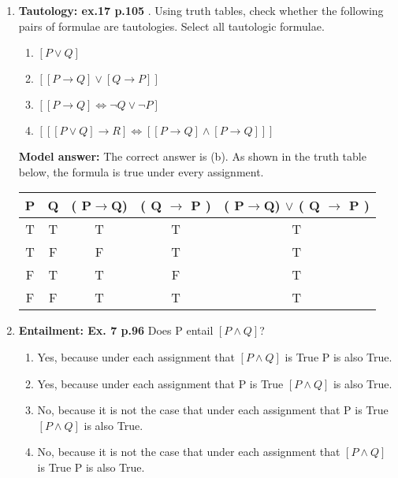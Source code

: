 \documentclass[a4,11pt]{article}
\newcommand{\6}{\mbox{$[\hspace*{-.6mm}[$}}
\newcommand{\9}{\mbox{$]\hspace*{-.6mm}]$}}
\begin{document}
\begin{enumerate}[leftmargin = 12pt]
\begin{enumerate}
\item T T T F equivalent
\item T T T F not equivalent
\item T F T F equivalent
\item T F T F not equivalent
\item T F T F equivalent
\item F F T F not equivalent
\end{enumerate}


{ \bf Model answer:} The correct answer is {\it T T T F equivalent}. The formulae are equivalent because they have the same truth values under every assignment.

\item {\bf Tautology: ex.17 p.105} . Using truth tables, check whether the following pairs of formulae are tautologies. Select all tautologic formulae.

\begin{enumerate}
\item $[P \lor Q]$
\item $[[P\rightarrow Q]  \lor  [Q \rightarrow P]]$
\item $[[P \rightarrow Q] \iff \neg Q \lor \neg P ]$ 
\item $[[[P \lor Q] \rightarrow  R] \iff [[P \rightarrow Q] \land [P \rightarrow  Q]]]$
\end{enumerate}


{ \bf Model answer:} The correct answer is (b). As shown in the truth table below, the formula is true under every assignment.

\begin{tabular}{c | c | c | c | c}
\hline \hline
P & Q &  ( P$\rightarrow$Q) & ( Q $\rightarrow$ P )  & ( P$\rightarrow$Q) $\lor$ ( Q $\rightarrow$ P ) \\
\hline
T & T & T& T & T\\
T & F & F& T & T\\
F & T & T & F& T\\
F & F & T& T& T \\
\hline \hline
\end{tabular}

\item {\bf Entailment: Ex. 7 p.96} Does P entail $[P \land Q]$?

\begin{enumerate}[noitemsep]
\item Yes, because under each assignment that $[P \land Q]$ is True P is also True.
\item Yes, because under each assignment that P is True $[P \land Q]$ is also True.
\item No, because it is not the case that under each assignment that P is True $[P \land Q]$ is also True.
\item No, because it is not the case that under each assignment that $[P \land Q]$ is True P is also True.
\end{enumerate}


\end{enumerate}
\end{document}
